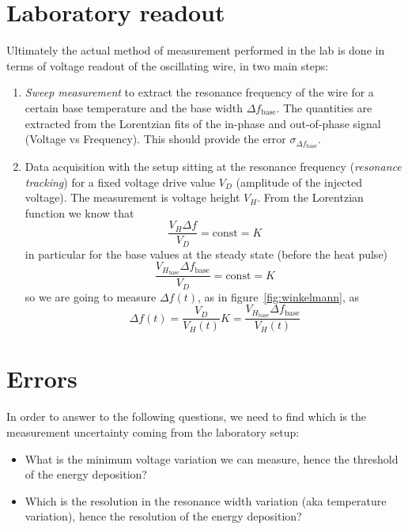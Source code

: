 \documentclass[a4paper,12pt]{article}
\begin{document}

\section{Laboratory readout}

Ultimately the actual method of measurement performed in the lab is done in terms of voltage readout of the oscillating wire, in two main steps:
\begin{enumerate}

  \item \textit{Sweep measurement} to extract the resonance frequency of the wire for a certain base temperature and the base width $\Delta f_\mathrm{base}$. The quantities are extracted from the Lorentzian fits of the in-phase and out-of-phase signal (Voltage vs Frequency). This should provide the error $\sigma_{\Delta f_\mathrm{base}}$.
  \item Data acquisition with the setup sitting at the resonance frequency (\textit{resonance tracking}) for a fixed voltage drive value $V_D$ (amplitude of the injected voltage). The measurement is voltage height $V_H$. From the Lorentzian function we know that
  \begin{equation}
    \frac{V_H\Delta f}{V_D} = \mathrm{const} = K
  \end{equation}
in particular for the base values at the steady state (before the heat pulse)
  \begin{equation}
    \frac{V_{H_\mathrm{base}}\Delta f_\mathrm{base}}{V_D} = \mathrm{const} = K
  \end{equation}
so we are going to measure $\Delta f(t)$, as in figure~\ref{fig:winkelmann}, as
  \begin{equation}
    \Delta f(t) = \frac{V_D}{V_H(t)}K = \frac{V_{H_\mathrm{base}} \Delta f_\mathrm{base}}{V_H(t)}
  \end{equation}
  
\end{enumerate}


\section{Errors}

In order to answer to the following questions, we need to find which is the measurement uncertainty coming from the laboratory setup:
\begin{itemize}

  \item What is the minimum voltage variation we can measure, hence the threshold of the energy deposition? 
  \item Which is the resolution in the resonance width variation (aka temperature variation), hence the resolution of the energy deposition?

\end{itemize}
\end{document}
